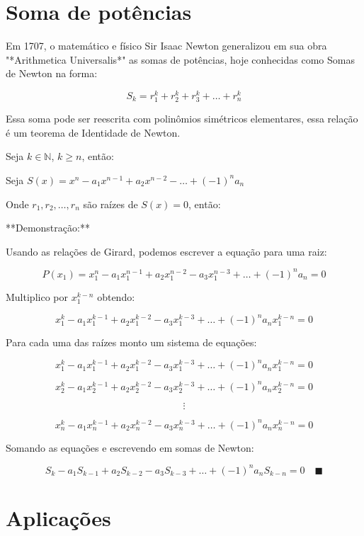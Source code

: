 \chapter{Soma de potências}
Em 1707, o matemático e físico Sir Isaac Newton generalizou em sua obra "*Arithmetica Universalis*" as somas de potências, hoje conhecidas como Somas de Newton na forma:

$$S_{k} = r_{1}^{k} + r_{2}^{k} + r_{3}^{k} + \dots + r_{n}^{k}$$

Essa soma pode ser reescrita com polinômios simétricos elementares, essa relação é um teorema de Identidade de Newton.

Seja $k \in \mathbb{N}$, $k \ge n$, então:

Seja $S(x) = x^{n} - a_{1}x^{n-1} + a_{2}x^{n-2} - \dots + (-1)^{n}a_{n}$

Onde $r_{1}, r_{2}, \dots, r_{n}$ são raízes de $S(x)=0$, então:

**Demonstração:**

Usando as relações de Girard, podemos escrever a equação para uma raiz:

$$P(x_{1}) = x_{1}^{n} - a_{1}x_{1}^{n-1} + a_{2}x_{1}^{n-2} - a_{3}x_{1}^{n-3} + \dots + (-1)^{n}a_{n} = 0$$

Multiplico por $x_{1}^{k-n}$ obtendo:

$$x_{1}^{k} - a_{1}x_{1}^{k-1} + a_{2}x_{1}^{k-2} - a_{3}x_{1}^{k-3} + \dots + (-1)^{n}a_{n}x_{1}^{k-n} = 0$$

Para cada uma das raízes monto um sistema de equações:

$$x_{1}^{k} - a_{1}x_{1}^{k-1} + a_{2}x_{1}^{k-2} - a_{3}x_{1}^{k-3} + \dots + (-1)^{n}a_{n}x_{1}^{k-n} = 0$$

$$x_{2}^{k} - a_{1}x_{2}^{k-1} + a_{2}x_{2}^{k-2} - a_{3}x_{2}^{k-3} + \dots + (-1)^{n}a_{n}x_{2}^{k-n} = 0$$

$$\vdots$$

$$x_{n}^{k} - a_{1}x_{n}^{k-1} + a_{2}x_{n}^{k-2} - a_{3}x_{n}^{k-3} + \dots + (-1)^{n}a_{n}x_{n}^{k-n} = 0$$

Somando as equações e escrevendo em somas de Newton:

$$S_{k} - a_{1}S_{k-1} + a_{2}S_{k-2} - a_{3}S_{k-3} + \dots + (-1)^{n}a_{n}S_{k-n} = 0 \quad \blacksquare$$
\chapter{Aplicações}

\postextual